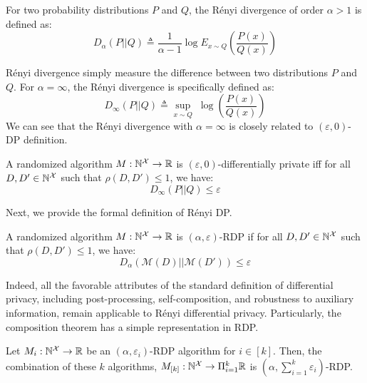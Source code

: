 \begin{definition}
  For two probability distributions $P$ and $Q$, the R\'enyi divergence of order $\alpha > 1$ is defined as:
  \begin{equation*}
    D_{\alpha}(P||Q) \triangleq \frac{1}{\alpha-1} \log E_{x \sim Q}\left ( \frac{P(x)}{Q(x)} \right )
  \end{equation*}
\end{definition}
R\'enyi divergence simply measure the difference between two distributions $P$ and $Q$.
For $\alpha = \infty$, the R\'enyi divergence is specifically defined as:
\begin{equation*}
  D_{\infty}(P||Q) \triangleq  \sup_{x \sim Q} \; \log \left ( \frac{P(x)}{Q(x)} \right ) 
\end{equation*}
We can see that the R\'enyi divergence with $\alpha=\infty$ is closely related to $(\varepsilon, 0)$-DP definition.
\begin{proposition}
  A randomized algorithm $M: \mathbb{N}^\mathcal{X} \rightarrow \mathbb{R}$ is $(\varepsilon, 0)$-differentially private iff for all $D, D' \in \mathbb{N}^\mathcal{X}$ such that $\rho(D, D') \leq 1$, we have:
  \begin{equation*}
    D_{\infty}(P||Q) \leq \varepsilon
  \end{equation*} 
\end{proposition}
\noindent Next, we provide the formal definition of R\'enyi DP.
\begin{definition}
  A randomized algorithm $M: \mathbb{N}^\mathcal{X} \rightarrow \mathbb{R}$ is $(\alpha, \varepsilon)$-RDP if for all $D, D' \in \mathbb{N}^\mathcal{X}$ such that $\rho(D, D') \leq 1$, we have:
  \begin{equation*}
    D_{\alpha}(\mathcal{M}(D)||\mathcal{M}(D')) \leq \varepsilon
  \end{equation*}
\end{definition}
\noindent Indeed, all the favorable attributes of the standard definition of differential privacy, including post-processing, self-composition, and robustness to auxiliary information, remain applicable to R\'enyi differential  privacy.
Particularly, the composition theorem has a simple representation in RDP.
\begin{proposition}\label{prop:rdp-composition}
  Let $M_i: \mathbb{N}^\mathcal{X} \rightarrow \mathbb{R}$ be an $(\alpha, \varepsilon_i)$-RDP algorithm for $i \in [k]$. Then, the combination of these $k$ algorithms, $M_{[k]}: \mathbb{N}^\mathcal{X} \rightarrow \Pi_{i=1}^{k}\mathbb{R}$ is $(\alpha, \sum_{i=1}^{k}\varepsilon_i)$-RDP.   
\end{proposition}
